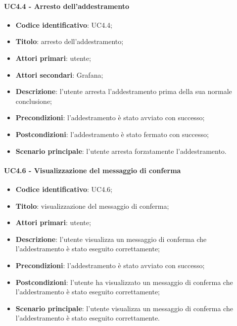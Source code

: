 \paragraph{UC4.4 - Arresto dell'addestramento}
\begin{itemize}
	\item \textbf{Codice identificativo}: UC4.4;
	\item \textbf{Titolo}: arresto dell'addestramento;
	\item \textbf{Attori primari}: utente;
	\item \textbf{Attori secondari}: Grafana\glo;
	\item \textbf{Descrizione}: l'utente arresta l'addestramento prima della sua normale conclusione;
	\item \textbf{Precondizioni}: l'addestramento è stato avviato con successo;
	\item \textbf{Postcondizioni}: l'addestramento è stato fermato con successo;
	\item \textbf{Scenario principale}: l'utente arresta forzatamente l'addestramento.
\end{itemize}

\paragraph{UC4.6 - Visualizzazione del messaggio di conferma}
\begin{itemize}
	\item \textbf{Codice identificativo}: UC4.6;
	\item \textbf{Titolo}: visualizzazione del messaggio di conferma;
	\item \textbf{Attori primari}: utente;
	\item \textbf{Descrizione}: l'utente visualizza un messaggio di conferma che l'addestramento è stato eseguito correttamente;
	\item \textbf{Precondizioni}: l'addestramento è stato avviato con successo;
	\item \textbf{Postcondizioni}: l'utente ha visualizzato un messaggio di conferma che l'addestramento è stato eseguito correttamente;
	\item \textbf{Scenario principale}: l'utente visualizza un messaggio di conferma che l'addestramento è stato eseguito correttamente.
\end{itemize}

